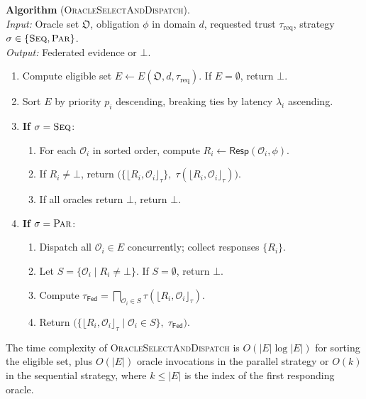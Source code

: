 \documentclass[11pt]{article}
\newcommand{\Oracle}{\mathcal{O}}            %
\newcommand{\OrcSet}{\mathfrak{O}}           %
\newcommand{\Orcl}[1]{\Oracle_{#1}}         %
\newcommand{\tlev}[1]{\tau(#1)}              %
\newcommand{\Fed}{\mathsf{Fed}}             %
\newcommand{\Ceil}[1]{\lfloor #1 \rfloor_{\tau}}   %
\newcommand{\Resp}{\mathsf{Resp}}           %
\begin{document}
\noindent\textbf{Algorithm} (\textsc{OracleSelectAndDispatch}).\\
\textit{Input:} Oracle set $\OrcSet$, obligation $\phi$ in domain $d$,
requested trust $\tau_{\mathrm{req}}$, strategy
$\sigma \in \{\textsc{Seq}, \textsc{Par}\}$.\\
\textit{Output:} Federated evidence or $\bot$.
\begin{enumerate}[label=\textbf{\arabic*.}, nosep, leftmargin=2em]
  \item Compute eligible set
        $E \gets E(\OrcSet, d, \tau_{\mathrm{req}})$.
        If $E = \emptyset$, return $\bot$.
  \item Sort $E$ by priority $p_i$ descending, breaking ties by
        latency $\lambda_i$ ascending.
  \item \textbf{If} $\sigma = \textsc{Seq}$:
    \begin{enumerate}[label=\textbf{\alph*.}, nosep, leftmargin=1.5em]
      \item For each $\Orcl{i}$ in sorted order, compute
            $R_i \gets \Resp(\Orcl{i}, \phi)$.
      \item If $R_i \neq \bot$, return
            $\bigl(\{\Ceil{R_i, \Orcl{i}}\},\;
             \tlev{\Ceil{R_i, \Orcl{i}}}\bigr)$.
      \item If all oracles return $\bot$, return $\bot$.
    \end{enumerate}
  \item \textbf{If} $\sigma = \textsc{Par}$:
    \begin{enumerate}[label=\textbf{\alph*.}, nosep, leftmargin=1.5em]
      \item Dispatch all $\Orcl{i} \in E$ concurrently; collect
            responses $\{R_i\}$.
      \item Let $S = \{\Orcl{i} \mid R_i \neq \bot\}$.  If
            $S = \emptyset$, return $\bot$.
      \item Compute $\tau_{\Fed} = \bigsqcap_{\Orcl{i} \in S}
            \tlev{\Ceil{R_i, \Orcl{i}}}$.
      \item Return $\bigl(\{\Ceil{R_i, \Orcl{i}} \mid \Orcl{i} \in S\},\;
            \tau_{\Fed}\bigr)$.
    \end{enumerate}
\end{enumerate}

\begin{proposition}\label{prop:selection-complexity}
  The time complexity of \textsc{OracleSelectAndDispatch} is
  $O(|E| \log |E|)$ for sorting the eligible set, plus $O(|E|)$ oracle
  invocations in the parallel strategy or $O(k)$ in the sequential
  strategy, where $k \leq |E|$ is the index of the first responding oracle.
\end{proposition}
\end{document}
